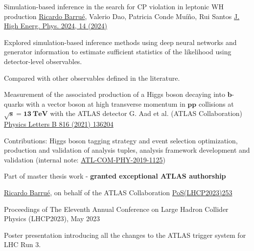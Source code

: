 


\begin{cventries}

    \cventry
    {Simulation-based inference in the search for CP violation in leptonic WH production}
    {\underline{Ricardo Barrué}, Valerio Dao, Patricia Conde Muíño, Rui Santos}
    {}
    {\href{https://doi.org/10.1007/JHEP04(2024)014}{J. High Energ. Phys. 2024, 14 (2024)}}
    {
        \begin{cvitems}
        \item {Explored simulation-based inference methods using deep neural networks and generator information to estimate sufficient statistics of the likelihood using detector-level observables.}
        \item {Compared with other observables defined in the literature.}
        \end{cvitems}
    }%

    \cventry
    {Measurement of the associated production of a Higgs boson decaying into $\mathbf{b}$-quarks with a vector boson at high transverse momentum in $\mathbf{pp}$ collisions at $\mathbf{\sqrt{s}= 13 \:\text{TeV}}$ with the ATLAS detector}
    {G. Aad et al. (ATLAS Collaboration)}
    {}
    {\href{https://doi.org/10.1016/j.physletb.2021.136204}{Physics Letters B 816 (2021) 136204}}
    {
        \begin{cvitems}
            \item {Contributions: Higgs boson tagging strategy and event selection optimization, production and validation of analysis tuples, analysis framework development and validation (internal note: \href{https://cds.cern.ch/record/2688371}{ATL-COM-PHY-2019-1125})}
            \item {Part of master thesis work - \textbf{granted exceptional ATLAS authorship}}
        \end{cvitems}
    }
    
\end{cventries}


\begin{cventries}
    {\underline{Ricardo Barrué}, on behalf of the ATLAS Collaboration}{}
    {\href{https://pos.sissa.it/450/253/}{PoS(LHCP2023)253}}
    {
        \begin{cvitems}
            \item {Proceedings of The Eleventh Annual Conference on Large Hadron Collider Physics (LHCP2023), May 2023}
            \item {Poster presentation introducing all the changes to the ATLAS trigger system for LHC Run 3.}
        \end{cvitems}
    }
\end{cventries}

